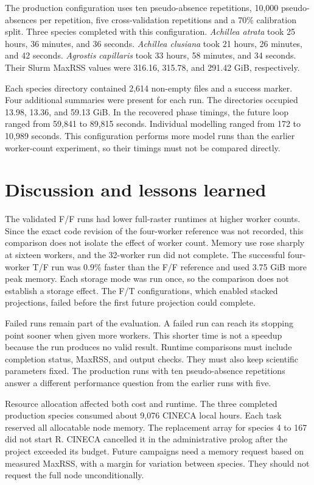 The production configuration uses ten pseudo-absence repetitions, 10,000 pseudo-absences per repetition, five cross-validation repetitions and a 70\% calibration split. Three species completed with this configuration. \textit{Achillea atrata} took 25 hours, 36 minutes, and 36 seconds. \textit{Achillea clusiana} took 21 hours, 26 minutes, and 42 seconds. \textit{Agrostis capillaris} took 33 hours, 58 minutes, and 34 seconds. Their Slurm MaxRSS values were 316.16, 315.78, and 291.42 GiB, respectively.

Each species directory contained 2,614 non-empty files and a success marker. Four additional summaries were present for each run. The directories occupied 13.98, 13.36, and 59.13 GiB. In the recovered phase timings, the future loop ranged from 59,841 to 89,815 seconds. Individual modelling ranged from 172 to 10,989 seconds. This configuration performs more model runs than the earlier worker-count experiment, so their timings must not be compared directly.

\section{Discussion and lessons learned}

The validated F/F runs had lower full-raster runtimes at higher worker counts. Since the exact code revision of the four-worker reference was not recorded, this comparison does not isolate the effect of worker count. Memory use rose sharply at sixteen workers, and the 32-worker run did not complete. The successful four-worker T/F run was 0.9\% faster than the F/F reference and used 3.75 GiB more peak memory. Each storage mode was run once, so the comparison does not establish a storage effect. The F/T configurations, which enabled stacked projections, failed before the first future projection could complete.

Failed runs remain part of the evaluation. A failed run can reach its stopping point sooner when given more workers. This shorter time is not a speedup because the run produces no valid result. Runtime comparisons must include completion status, MaxRSS, and output checks. They must also keep scientific parameters fixed. The production runs with ten pseudo-absence repetitions answer a different performance question from the earlier runs with five.

Resource allocation affected both cost and runtime. The three completed production species consumed about 9,076 CINECA local hours. Each task reserved all allocatable node memory. The replacement array for species 4 to 167 did not start R. CINECA cancelled it in the administrative prolog after the project exceeded its budget. Future campaigns need a memory request based on measured MaxRSS, with a margin for variation between species. They should not request the full node unconditionally.

